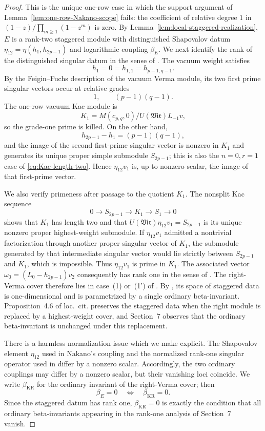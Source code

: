 \documentclass[12pt,leqno]{amsart}
\numberwithin{equation}{section}
\newcommand{\Vir}{\mathfrak{Vir}}
\begin{document}
\begin{proof}
This is the unique one-row case in which the support argument of
Lemma~\ref{lem:one-row-Nakano-scope} fails: the coefficient of relative
degree $1$ in $(1-z)/\prod_{m\ge1}(1-z^m)$ is zero.  By
Lemma~\ref{lem:local-staggered-realization}, $E$ is a rank-two staggered
module with distinguished Shapovalov datum
$\eta_{12}=\eta(h_1,h_{2p-1})$ and logarithmic coupling $\beta_E$.
We next identify the rank of the distinguished singular datum in the
sense of \cite{KytolaRidout}.  The vacuum weight satisfies
\[
 h_1=0=h_{1,1}=h_{p-1,q-1}.
\]
By the Feigin--Fuchs description of the vacuum Verma module, its two
first prime singular vectors occur at relative grades
\[
 1,\qquad (p-1)(q-1).
\]
The one-row vacuum Kac module is
\[
 K_1=M(c_{p,q},0)\big/U(\Vir)L_{-1}v,
\]
so the grade-one prime is killed.  On the other hand,
\[
 h_{2p-1}-h_1=(p-1)(q-1),
\]
and the image of the second first-prime singular vector is nonzero in
$K_1$ and generates its unique proper simple submodule
$S_{2p-1}$; this is also the $n=0,r=1$ case of
\eqref{eq:Kac-length-two}.  Hence $\eta_{12}v_1$ is, up to nonzero
scalar, the image of that first-prime vector.

We also verify primeness after passage to the quotient $K_1$.  The
nonsplit Kac sequence
\[
 0\longrightarrow S_{2p-1}\longrightarrow K_1
 \longrightarrow S_1\longrightarrow0
\]
shows that $K_1$ has length two and that
$U(\Vir)\eta_{12}v_1=S_{2p-1}$ is its unique nonzero proper
highest-weight submodule.  If $\eta_{12}v_1$ admitted a nontrivial
factorization through another proper singular vector of $K_1$, the
submodule generated by that intermediate singular vector would lie
strictly between $S_{2p-1}$ and $K_1$, which is impossible.  Thus
$\eta_{12}v_1$ is prime in $K_1$.  The associated vector
$\omega_0=(L_0-h_{2p-1})v_2$ consequently has rank one in the sense of
\cite[Section~2]{KytolaRidout}.  The
right-Verma cover therefore lies in case~(1) or~(1') of
\cite[Sections~6.4--6.5]{KytolaRidout}.  By
\cite[Theorems~6.14--6.15]{KytolaRidout}, its space of staggered data is
one-dimensional and is parametrized by a single ordinary beta-invariant.
Proposition~4.6 of loc.~cit. preserves the staggered data when the right
module is replaced by a highest-weight cover, and Section~7 observes that
the ordinary beta-invariant is unchanged under this replacement.

There is a harmless normalization issue which we make explicit.  The
Shapovalov element $\eta_{12}$ used in Nakano's coupling and the normalized
rank-one singular operator used in \cite{KytolaRidout} differ by a
nonzero scalar.  Accordingly, the two ordinary couplings may differ by a
nonzero scalar, but their vanishing loci coincide.  We write
$\beta_{\mathrm{KR}}$ for the ordinary invariant of the right-Verma cover;
then
\begin{equation}\label{eq:vacuum-beta-normalization}
 \beta_E=0\quad\Longleftrightarrow\quad
 \beta_{\mathrm{KR}}=0.
\end{equation}
Since the staggered datum has rank one, $\beta_{\mathrm{KR}}=0$ is exactly
the condition that all ordinary beta-invariants appearing in the
rank-one analysis of Section~7 vanish.


\end{proof}
\end{document}
